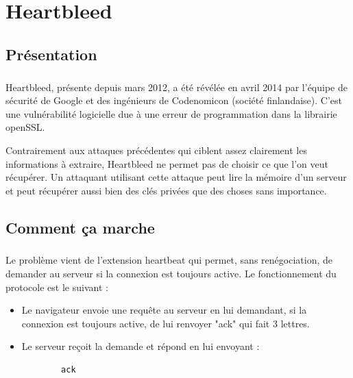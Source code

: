 \chapter{Heartbleed}
\label{chapter:Heartbleed}

\section{Présentation}
\paragraph{}
Heartbleed, présente depuis mars 2012, a été révélée en avril 2014 par l'équipe de sécurité de Google et des ingénieurs de Codenomicon (société finlandaise). C'est une vulnérabilité logicielle due à une erreur de programmation dans la librairie openSSL.

Contrairement aux attaques précédentes qui ciblent assez clairement les informations à extraire, Heartbleed ne permet pas de choisir ce que l'on veut récupérer. Un attaquant utilisant cette attaque peut lire la mémoire d'un serveur et peut récupérer aussi bien des clés privées que des choses sans importance.

\section{Comment ça marche}
\paragraph{}
Le problème vient de l'extension heartbeat qui permet, sans renégociation, de demander au serveur si la connexion est toujours active. Le fonctionnement du protocole est le suivant :
\begin{itemize}
  \item Le navigateur envoie une requête au serveur en lui demandant, si la connexion est toujours active, de lui renvoyer "ack" qui fait 3 lettres.
  \item Le serveur reçoit la demande et répond en lui envoyant :
  	\begin{verbatim}
		ack
	\end{verbatim}
\end{itemize}

